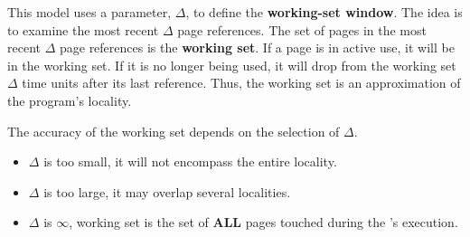 This model uses a parameter, $\Delta$, to define the \textbf{working-set window}.
The idea is to examine the most recent $\Delta$ page references.
The set of pages in the most recent $\Delta$ page references is the \textbf{working set}.
If a page is in active use, it will be in the working set.
If it is no longer being used, it will drop from the working set $\Delta$ time units after its last reference.
Thus, the working set is an approximation of the program’s locality.

The accuracy of the working set depends on the selection of $\Delta$.
\begin{itemize}[noitemsep]
\item $\Delta$ is too small, it will not encompass the entire locality.
\item $\Delta$ is too large, it may overlap several localities.
\item $\Delta$ is $\infty$, working set is the set of \textbf{ALL} pages touched during the 's execution.
\end{itemize}


